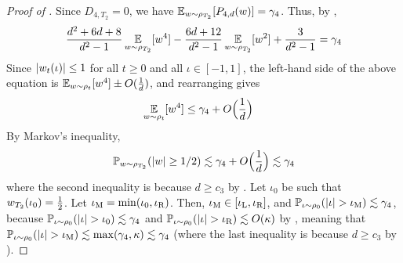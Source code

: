 \begin{proof}[Proof of ]
Since $D_{4, T_2} = 0$, we have $\operatorname*{\mathbb{E}}_{w \sim \rho_{T_2}}[{P_{4, d}}(w)] = \gamma_4$. Thus, by ,
\begin{align}
\frac{d^2 + 6d + 8}{d^2 - 1} \operatorname*{\mathbb{E}}_{w \sim \rho_{T_2}} [w^4] - \frac{6d + 12}{d^2 - 1} \operatorname*{\mathbb{E}}_{w \sim \rho_{T_2}} [w^2] + \frac{3}{d^2 - 1} = \gamma_4
\end{align}
Since $|w_t(\iota)| \leq 1$ for all $t \geq 0$ and all $\iota \in [-1, 1]$, the left-hand side of the above equation is $\operatorname*{\mathbb{E}}_{w \sim \rho_t} [w^4] \pm O(\frac{1}{d})$, and rearranging gives
\begin{align}
\operatorname*{\mathbb{E}}_{w \sim \rho_t} [w^4]
& \leq \gamma_4 + O\Big(\frac{1}{d}\Big)
\end{align}
By Markov's inequality,
\begin{align}
\mathbb{P}_{w \sim \rho_{T_2}}(|w| \geq 1/2)
 \lesssim \gamma_4 + O\Big(\frac{1}{d}\Big) 
 \lesssim \gamma_4
\end{align}
where the second inequality is because $d \geq c_3$ by . Let $\iota_0$ be such that $w_{T_2}(\iota_0) = \frac{1}{2}$. Let $\iota_{\textup{M}} = \min(\iota_0, \iota_{\textup{R}})$. Then, $\iota_{\textup{M}} \in [\iota_{\textup{L}}, \iota_{\textup{R}}]$, and $\mathbb{P}_{\iota \sim \rho_0}(|\iota| > \iota_{\textup{M}}) \lesssim \gamma_4$, because $\mathbb{P}_{\iota \sim \rho_0}(|\iota| > \iota_0) \lesssim \gamma_4$ and $\mathbb{P}_{\iota \sim \rho_0}(|\iota| > \iota_{\textup{R}}) \lesssim O(\kappa)$ by , meaning that $\mathbb{P}_{\iota \sim \rho_0} (|\iota| > \iota_{\textup{M}}) \lesssim \max(\gamma_4, \kappa) \lesssim \gamma_4$ (where the last inequality is because $d \geq c_3$ by ).


\end{proof}
